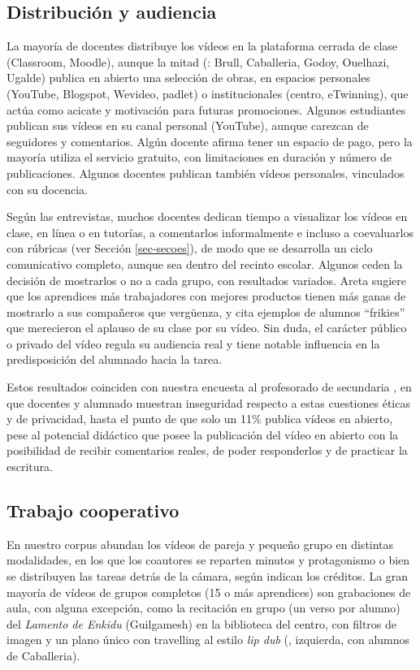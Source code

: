 \documentclass[spanish]{textolivre}
\begin{document}
\subsection{Distribución y audiencia}\label{sec-titulo}
La mayoría de docentes distribuye los vídeos en la plataforma cerrada de clase (Classroom, Moodle), aunque la mitad (: Brull, Caballeria, Godoy, Ouelhazi, Ugalde) publica en abierto una selección de obras, en espacios personales (YouTube, Blogspot, Wevideo, padlet) o institucionales (centro, eTwinning), que actúa como acicate y motivación para futuras promociones. Algunos estudiantes publican sus vídeos en su canal personal (YouTube), aunque carezcan de seguidores y comentarios. Algún docente afirma tener un espacio de pago, pero la mayoría utiliza el servicio gratuito, con limitaciones en duración y número de publicaciones. Algunos docentes publican también vídeos personales, vinculados con su docencia.

Según las entrevistas, muchos docentes dedican tiempo a visualizar los vídeos en clase, en línea o en tutorías, a comentarlos informalmente e incluso a coevaluarlos con rúbricas (ver Sección \ref{sec-secoes}), de modo que se desarrolla un ciclo comunicativo completo, aunque sea dentro del recinto escolar. Algunos ceden la decisión de mostrarlos o no a cada grupo, con resultados variados. Areta sugiere que los aprendices más trabajadores con mejores productos tienen más ganas de mostrarlo a sus compañeros que vergüenza, y cita ejemplos de alumnos “frikies” que merecieron el aplauso de su clase por su vídeo. Sin duda, el carácter público o privado del vídeo regula su audiencia real y tiene notable influencia en la predisposición del alumnado hacia la tarea.

Estos resultados coinciden con nuestra encuesta al profesorado de secundaria \cite{cassany_ya_2021}, en que docentes y alumnado muestran inseguridad respecto a estas cuestiones éticas y de privacidad, hasta el punto de que solo un 11\% publica vídeos en abierto, pese al potencial didáctico que posee la publicación del vídeo en abierto con la posibilidad de recibir comentarios reales, de poder responderlos y de practicar la escritura.

\subsection{Trabajo cooperativo}\label{sec-autores}
En nuestro corpus abundan los vídeos de pareja y pequeño grupo en distintas modalidades, en los que los coautores se reparten minutos y protagonismo o bien se distribuyen las tareas detrás de la cámara, según indican los créditos. La gran mayoría de vídeos de grupos completos (15 o más aprendices) son grabaciones de aula, con alguna excepción, como la recitación en grupo (un verso por alumno) del \textit{Lamento de Enkidu} (Guilgamesh) en la biblioteca del centro, con filtros de imagen y un plano único con travelling al estilo \textit{lip dub} (, izquierda, con alumnos de Caballeria).
\end{document}
